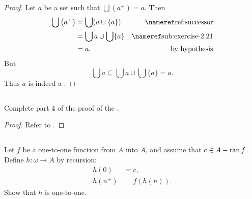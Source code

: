 \documentclass{report}
\begin{document}
  \begin{proof}
    Let $a$ be a set such that $\bigcup \left(a^+\right) = a$.
    Then
      \begin{align*}
        \bigcup \left(a^+\right)
          & = \bigcup (a \cup \{a\}) & \textref{ref:successor} \\
          & = \bigcup a \cup \bigcup \{a\} & \textref{sub:exercise-2.21} \\
          & = a. & \text{by hypothesis}
      \end{align*}
    But $$\bigcup{a} \subseteq \bigcup a \cup \bigcup \{a\} = a.$$
    Thus $a$ is indeed a .
  \end{proof}

\subsection{}%

  Complete part 4 of the proof of the
    .

  \begin{proof}
    Refer to .
  \end{proof}

\subsection{}%

  Let $f$ be a one-to-one function from $A$ into $A$, and assume that
    $c \in A - \mathop{\text{ran}}{f}$.
  Define $h \colon \omega \rightarrow A$ by recursion:
    \begin{align*}
      h(0) & = c, \\
      h(n^+) & = f(h(n)).
    \end{align*}
  Show that $h$ is one-to-one.
\end{document}
